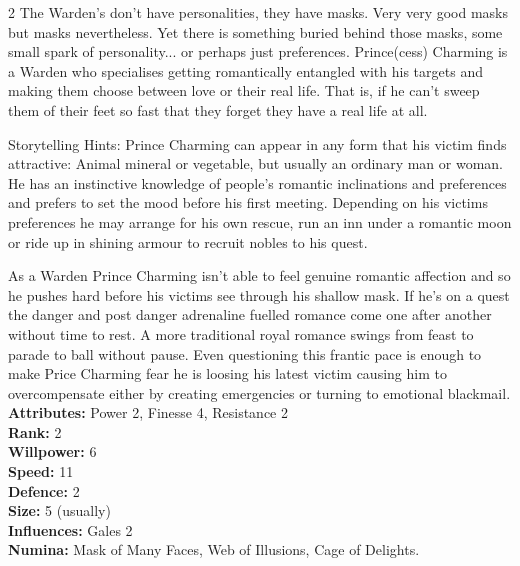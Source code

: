 \begin{multicols}{2}
The Warden's don't have personalities, they have masks. Very very good masks but masks nevertheless. Yet there is something buried behind those masks, some small spark of personality... or perhaps just preferences. Prince(cess) Charming is a Warden who specialises getting romantically entangled with his targets and making them choose between love or their real life. That is, if he can't sweep them of their feet so fast that they forget they have a real life at all. 

Storytelling Hints: Prince Charming can appear in any form that his victim finds attractive: Animal mineral or vegetable, but usually an ordinary man or woman. He has an instinctive knowledge of people's romantic inclinations and preferences and prefers to set the mood before his first meeting. Depending on his victims preferences he may arrange for his own rescue, run an inn under a romantic moon or ride up in shining armour to recruit nobles to his quest. 

As a Warden Prince Charming isn't able to feel genuine romantic affection and so he pushes hard before his victims see through his shallow mask. If he's on a quest the danger and post danger adrenaline fuelled romance come one after another without time to rest. A more traditional royal romance swings from feast to parade to ball without pause. Even questioning this frantic pace is enough to make Price Charming fear he is loosing his latest victim causing him to overcompensate either by creating emergencies or turning to emotional blackmail. \\

\noindent \textbf{Attributes:} Power 2, Finesse 4, Resistance 2\\

\noindent \textbf{Rank:} 2\\

\noindent \textbf{Willpower:} 6\\

\noindent \textbf{Speed:} 11\\

\noindent \textbf{Defence:} 2\\

\noindent \textbf{Size:} 5 (usually)\\

\noindent \textbf{Influences:} Gales 2\\

\noindent \textbf{Numina:} Mask of Many Faces, Web of Illusions, Cage of Delights. \\


\end{multicols}
